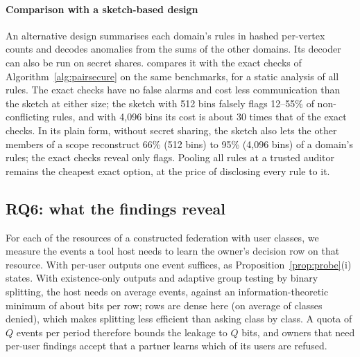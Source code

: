 \paragraph{Comparison with a sketch-based design} An alternative design summarises each domain's rules in hashed per-vertex counts and decodes anomalies from the sums of the other domains. Its decoder can also be run on secret shares.  compares it with the exact checks of Algorithm~\ref{alg:pairsecure} on the same benchmarks, for a static analysis of all rules. The exact checks have no false alarms and cost less communication than the sketch at either size; the sketch with 512 bins falsely flags 12--55\% of non-conflicting rules, and with 4,096 bins its cost is about 30 times that of the exact checks. In its plain form, without secret sharing, the sketch also lets the other members of a scope reconstruct 66\% (512 bins) to 95\% (4,096 bins) of a domain's rules; the exact checks reveal only flags. Pooling all rules at a trusted auditor remains the cheapest exact option, at the price of disclosing every rule to it.

\begin{table}[t]
\centering\small
\caption{Static cross-domain analysis on three benchmarks (2,400 rules, six domains): sketch decoder on secret shares at 512 and 4,096 bins against the exact secret-shared checks. FPR: false-positive rate of conflict detection; MB: online communication between servers per domain (16 bytes per Beaver product); s: local computation per domain.}\label{tab:static}
\end{table}

\subsection{RQ6: what the findings reveal}\label{sec:leakeval}
For each of the \leakRes{} resources of a constructed federation with \leakClasses{} user classes, we measure the events a tool host needs to learn the owner's decision row on that resource. With per-user outputs one event suffices, as Proposition~\ref{prop:probe}(i) states. With existence-only outputs and adaptive group testing by binary splitting, the host needs on average \leakProbes{} events, against an information-theoretic minimum of about \leakEntropy{} bits per row; rows are dense here (on average \leakDenied{} of \leakClasses{} classes denied), which makes splitting less efficient than asking class by class. A quota of $Q$ events per period therefore bounds the leakage to $Q$ bits, and owners that need per-user findings accept that a partner learns which of its users are refused.


